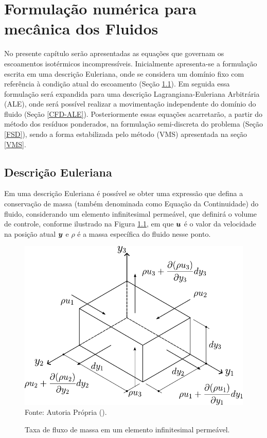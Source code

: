 \chapter{Formulação numérica para mecânica dos Fluidos} \label{EGDF}

No presente capítulo serão apresentadas as equações que governam os escoamentos isotérmicos incompressíveis. Inicialmente apresenta-se a formulação escrita em uma descrição Euleriana, onde se considera um domínio fixo com referência à condição atual do escoamento (Seção \ref{CFD-E}). Em seguida essa formulação será expandida para uma descrição Lagrangiana-Euleriana Arbitrária (ALE), onde será possível realizar a movimentação independente do domínio do fluido (Seção \ref{CFD-ALE}). Posteriormente essas equações acarretarão, a partir do método dos resíduos ponderados, na formulação semi-discreta do problema (Seção \ref{FSD}), sendo a forma estabilizada pelo método \VMS (VMS) apresentada na seção \ref{VMS}.

\section{Descrição Euleriana} \label{CFD-E}

Em uma descrição Euleriana é possível se obter uma expressão que defina a conservação de massa (também denominada como Equação da Continuidade) do fluido, considerando um elemento infinitesimal permeável, que definirá o volume de controle, conforme ilustrado na Figura \ref{fig:BalMas}, em que $\boldsymbol{u}$ é o valor da velocidade na posição atual $\boldsymbol{y}$ e $\rho$ é a massa específica do fluido nesse ponto.

\begin{figure}[h!]
    \centering
    \caption{Taxa de fluxo de massa em um elemento infinitesimal permeável.}
    \includegraphics[width=.5\linewidth]{Figuras/BalMas.pdf}
    \\Fonte: Autoria Própria (\the\year).
    \label{fig:BalMas}
\end{figure}


